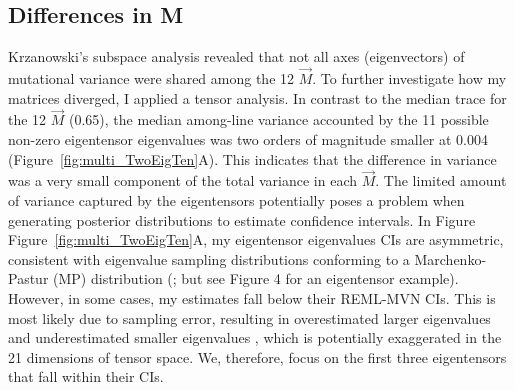 \subsection{Differences in M}
Krzanowski’s subspace analysis revealed that not all axes (eigenvectors) of mutational variance were shared among the 12 $\vec{M}$. To further investigate how my matrices diverged, I applied a tensor analysis. In contrast to the median trace for the 12 $\vec{M}$ (0.65), the median among-line variance accounted by the 11 possible non-zero eigentensor eigenvalues was two orders of magnitude smaller at 0.004 (Figure~\ref{fig:multi_TwoEigTen}A). This indicates that the difference in variance was a very small component of the total variance in each $\vec{M}$. The limited amount of variance captured by the eigentensors potentially poses a problem when generating posterior distributions to estimate confidence intervals. In Figure Figure~\ref{fig:multi_TwoEigTen}A, my eigentensor
eigenvalues CIs are asymmetric, consistent with eigenvalue sampling distributions conforming to a Marchenko-Pastur (MP) distribution (\citealt{Blow15}; but see \citealt{Agui14} Figure 4 for an eigentensor example). However, in some cases, my estimates fall below their REML-MVN CIs. This is most likely due to sampling error, resulting in overestimated larger eigenvalues and underestimated smaller eigenvalues \citep{Hill78, Szte17a}, which is potentially exaggerated in the 21 dimensions of tensor space. We, therefore, focus on the first three eigentensors that fall within their CIs.\par

